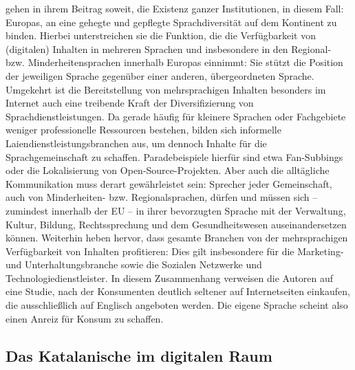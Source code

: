 \begin{sloppypar}
\citet[298]{bernardini_language_2020} gehen in ihrem Beitrag soweit, die Existenz ganzer Institutionen, in diesem Fall: Europas, an eine gehegte und gepflegte Sprachdiversität auf dem Kontinent zu binden. Hierbei unterstreichen sie die Funktion, die die Verfügbarkeit von (digitalen) Inhalten in mehreren Sprachen und insbesondere in den Regional- bzw. Minderheitensprachen innerhalb Europas einnimmt: Sie stützt die Position der jeweiligen Sprache gegenüber einer anderen, übergeordneten Sprache. Umgekehrt ist die Bereitstellung von mehrsprachigen Inhalten besonders im Internet auch eine treibende Kraft der Diversifizierung von Sprachdienstleistungen. Da gerade häufig für \glqq kleinere\grqq{} Sprachen oder Fachgebiete weniger professionelle Ressourcen bestehen, bilden sich informelle Laiendienstleistungsbranchen aus, um dennoch Inhalte für die Sprachgemeinschaft zu schaffen. Paradebeispiele hierfür sind etwa Fan-Subbings oder die Lokalisierung von Open-Source-Projekten. Aber auch die alltägliche Kommunikation muss derart gewährleistet sein: Sprecher jeder Gemeinschaft, auch von Minderheiten- bzw. Regionalsprachen, dürfen und müssen sich -- zumindest innerhalb der EU -- in ihrer bevorzugten Sprache mit der Verwaltung, Kultur, Bildung, Rechtssprechung und dem Gesundheitswesen auseinandersetzen können. Weiterhin heben \citet[298]{bernardini_language_2020} hervor, dass gesamte Branchen von der mehrsprachigen Verfügbarkeit von Inhalten profitieren: Dies gilt insbesondere für die Marketing- und Unterhaltungsbranche sowie die Sozialen Netzwerke und Technologiedienstleister. In diesem Zusammenhang verweisen die Autoren auf eine Studie, nach der Konsumenten deutlich seltener auf Internetseiten einkaufen, die ausschließlich auf Englisch angeboten werden. Die eigene Sprache scheint also einen Anreiz für Konsum zu schaffen.
\end{sloppypar}


\subsection{Das Katalanische im digitalen Raum}
\label{K2:subsec:Kat-DigRaum}


